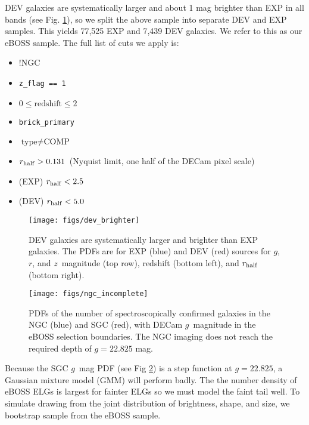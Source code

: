 \documentclass[a4paper,fleqn,usenatbib]{mnras}
\newcommand{\rhalf}{r_{\rm{half}}}
\newcommand{\gb}{$g$}
\newcommand{\rband}{$r$}
\newcommand{\zb}{$z$}
\newcommand{\tractor}{{\tt Tractor}}
\begin{document}
DEV galaxies are systematically larger and about 1 mag brighter than EXP in all bands (see Fig. \ref{fig:dev-brighter}), so we split the above sample into separate DEV and EXP samples. 
This yields 77,525 EXP and 7,439 DEV galaxies. 
We refer to this as our eBOSS sample. The full list of cuts we apply is:
\begin{itemize}
\item !NGC
\item \verb|z_flag == 1| 
\item $0 \le \text{redshift} \le 2$
\item \verb|brick_primary|
\item $\text{type} \neq \text{COMP}$
\item $\rhalf  > 0.131$\arcsec\, (Nyquist limit, one half of the DECam pixel scale)
\item (EXP) $\rhalf  < 2.5$\arcsec
\item (DEV) $\rhalf  < 5.0$\arcsec
\end{itemize}


\begin{figure}
 \texttt{[image: figs/dev\_brighter]}
 \caption{DEV galaxies are systematically larger and brighter than EXP galaxies. The PDFs are for EXP (blue) and DEV (red) sources for \gb, \rband, and \zb\, magnitude (top row), redshift (bottom left), and $\rhalf$ (bottom right).}
 \label{fig:dev-brighter}
\end{figure}

\begin{figure}
 \texttt{[image: figs/ngc\_incomplete]}
 \caption{PDFs of the number of spectroscopically confirmed galaxies in the NGC (blue) and SGC (red), with DECam \gb\, magnitude  in the eBOSS selection boundaries. The NGC imaging does not reach the required depth of $g = 22.825$ mag.}
 \label{fig:ngc-incomplete}
\end{figure}

Because the SGC \gb \, mag PDF (see Fig \ref{fig:ngc-incomplete}) is a step function at $g = 22.825$, a Gaussian mixture model (GMM) will perform badly. The the number density of eBOSS ELGs is largest for fainter ELGs so we must model the faint tail well. To simulate drawing from the joint distribution of brightness, shape, and size, we bootstrap sample from the eBOSS sample.
\end{document}
